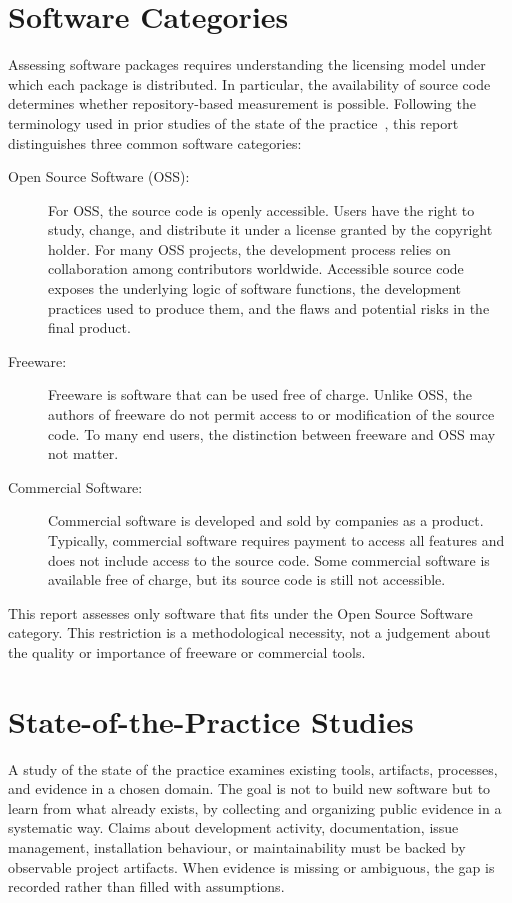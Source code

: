 \section{Software Categories}
\label{sec:software-categories}

Assessing software packages requires understanding the licensing model under which each package is distributed. In particular, the availability of source code determines whether repository-based measurement is possible. Following the terminology used in prior studies of the state of the practice~\citep{Smith2024MI,Smith2024LBM}, this report distinguishes three common software categories:

\begin{description}
    \item[Open Source Software (OSS):] For OSS, the source code is openly accessible. Users have the right to study, change, and distribute it under a license granted by the copyright holder. For many OSS projects, the development process relies on collaboration among contributors worldwide. Accessible source code exposes the underlying logic of software functions, the development practices used to produce them, and the flaws and potential risks in the final product.
    \item[Freeware:] Freeware is software that can be used free of charge. Unlike OSS, the authors of freeware do not permit access to or modification of the source code. To many end users, the distinction between freeware and OSS may not matter.
    \item[Commercial Software:] Commercial software is developed and sold by companies as a product. Typically, commercial software requires payment to access all features and does not include access to the source code. Some commercial software is available free of charge, but its source code is still not accessible.
\end{description}

This report assesses only software that fits under the Open Source Software category. This restriction is a methodological necessity, not a judgement about the quality or importance of freeware or commercial tools.

\section{State-of-the-Practice Studies}
\label{sec:state-of-practice-background}

A study of the state of the practice examines existing tools, artifacts, processes, and evidence in a chosen domain. The goal is not to build new software but to learn from what already exists, by collecting and organizing public evidence in a systematic way. Claims about development activity, documentation, issue management, installation behaviour, or maintainability must be backed by observable project artifacts. When evidence is missing or ambiguous, the gap is recorded rather than filled with assumptions.

